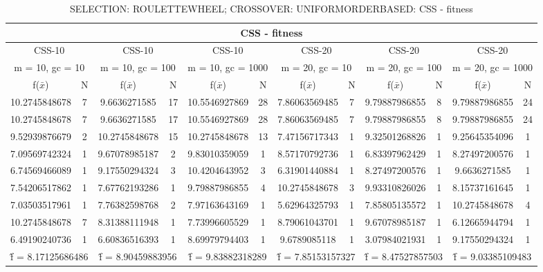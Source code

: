 \begin{table}[H]
	\centering
	\caption{SELECTION: ROULETTEWHEEL; CROSSOVER: UNIFORMORDERBASED: CSS - fitness}
	\begin{adjustbox}{width=1\textwidth}
		\begin{tabular}{ |c|c||c|c||c|c||c|c||c|c||c|c| }
			\hline
			\multicolumn{12}{|c|}{CSS - fitness} \\
			\hline
			\multicolumn{2}{|c||}{CSS-10} & \multicolumn{2}{c||}{CSS-10} & \multicolumn{2}{c||}{CSS-10} & \multicolumn{2}{c||}{CSS-20} & \multicolumn{2}{c||}{CSS-20} & \multicolumn{2}{c|}{CSS-20}\\
			\hline
			\multicolumn{2}{|c||}{m = 10, gc = 10} & \multicolumn{2}{c||}{m = 10, gc = 100} & \multicolumn{2}{c||}{m = 10, gc = 1000} & \multicolumn{2}{c||}{m = 20, gc = 10} & \multicolumn{2}{c||}{m = 20, gc = 100} & \multicolumn{2}{c|}{m = 20, gc = 1000}\\
			\hline
			f($\bar{x}$) & N & f($\bar{x}$) & N & f($\bar{x}$) & N & f($\bar{x}$) & N & f($\bar{x}$) & N & f($\bar{x}$) & N\\
			\hline
			\hline
			10.2745848678 & 7 & 9.6636271585 & 17 & 10.5546927869 & 28 & 7.86063569485 & 7 & 9.79887986855 & 8 & 9.79887986855 & 24\\
			\hline
			10.2745848678 & 7 & 9.6636271585 & 17 & 10.5546927869 & 28 & 7.86063569485 & 7 & 9.79887986855 & 8 & 9.79887986855 & 24\\
			9.52939876679 & 2 & 10.2745848678 & 15 & 10.2745848678 & 13 & 7.47156717343 & 1 & 9.32501268826 & 1 & 9.25645354096 & 1\\
			7.09569742324 & 1 & 9.67078985187 & 2 & 9.83010359059 & 1 & 8.57170792736 & 1 & 6.83397962429 & 1 & 8.27497200576 & 1\\
			6.74569466089 & 1 & 9.17550294324 & 3 & 10.4204643952 & 3 & 6.31901440884 & 1 & 8.27497200576 & 1 & 9.6636271585 & 1\\
			7.54206517862 & 1 & 7.67762193286 & 1 & 9.79887986855 & 4 & 10.2745848678 & 3 & 9.93310826026 & 1 & 8.15737161645 & 1\\
			7.03503517961 & 1 & 7.76382598768 & 2 & 7.97163643169 & 1 & 5.62964325793 & 1 & 7.85805135572 & 1 & 10.2745848678 & 4\\
			10.2745848678 & 7 & 8.31388111948 & 1 & 7.73996605529 & 1 & 8.79061043701 & 1 & 9.67078985187 & 1 & 6.12665944794 & 1\\
			6.49190240736 & 1 & 6.60836516393 & 1 & 8.69979794403 & 1 & 9.6789085118 & 1 & 3.07984021931 & 1 & 9.17550294324 & 1\\
			\hline
			\multicolumn{2}{|c||}{\^{f} = 8.17125686486} & \multicolumn{2}{c||}{\^{f} = 8.90459883956} & \multicolumn{2}{c||}{\^{f} = 9.83882318289} & \multicolumn{2}{c||}{\^{f} = 7.85153157327} & \multicolumn{2}{c||}{\^{f} = 8.47527857503} & \multicolumn{2}{c|}{\^{f} = 9.03385109483}\\
			\hline
		\end{tabular}
	\end{adjustbox}
\end{table}
